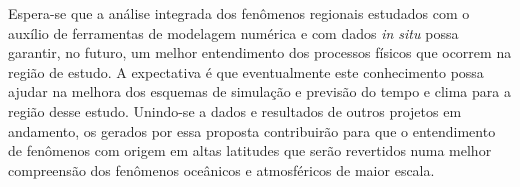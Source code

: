\documentclass{article}
\begin{document}
Espera-se que a análise integrada dos fenômenos regionais estudados com o auxílio de ferramentas de modelagem  
numérica e com dados \textit{in situ} possa garantir, no futuro, um melhor entendimento dos processos físicos que ocorrem na  
região de estudo. A expectativa é que eventualmente este conhecimento possa ajudar na melhora dos esquemas  de  
simulação e previsão do tempo e clima para a região desse estudo. Unindo-se a dados e resultados de outros projetos
em andamento, os gerados por essa proposta contribuirão para que o entendimento de fenômenos com origem em altas 
latitudes que serão revertidos numa melhor compreensão dos fenômenos oceânicos e atmosféricos de maior escala.

\linespread{1}
\printbibliography[ heading=bibintoc, title={REFERÊNCIAS BIBLIOGRÁFICAS}]
\end{document}
